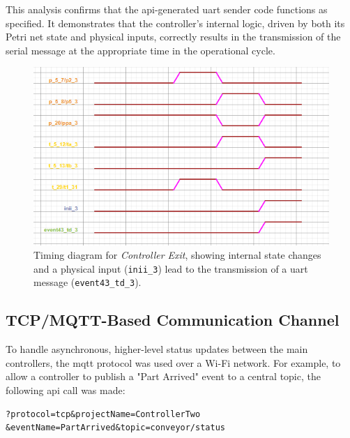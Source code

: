 This analysis confirms that the \gls{api}-generated \gls{uart} sender code functions as specified. It demonstrates that the controller's internal logic, driven by both its Petri net state and physical inputs, correctly results in the transmission of the serial message at the appropriate time in the operational cycle.

\begin{figure}[htb!]
    \centering
    \includegraphics[width=\columnwidth]{Chapters/Figures/timing_diagram_controller_three.png}
    \caption{Timing diagram for \textit{Controller Exit}, showing internal state changes and a physical input (\texttt{inii\_3}) lead to the transmission of a \gls{uart} message (\texttt{event43\_td\_3}).}
    \label{fig:timing_diagram_controller_three}
\end{figure}

\subsection{TCP/MQTT-Based Communication Channel}
\label{subsec:tcp_implementation}

To handle asynchronous, higher-level status updates between the main controllers, the \gls{mqtt} protocol was used over a Wi-Fi network. For example, to allow a controller to publish a "Part Arrived" event to a central topic, the following \gls{api} call was made:

\begin{verbatim}
?protocol=tcp&projectName=ControllerTwo
&eventName=PartArrived&topic=conveyor/status
\end{verbatim}

